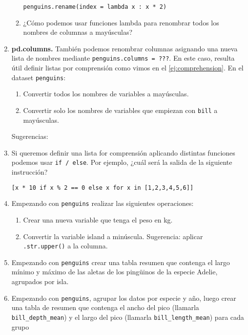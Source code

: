 \documentclass[a4paper,11pt]{article}
\theoremstyle{definition}
\begin{document}
\begin{enumerate}
\begin{enumerate}
\lstinline{penguins.rename(index = lambda x : x * 2)}

\item ¿Cómo podemos usar funciones lambda para renombrar todos los nombres de columnas a mayúsculas?
\end{enumerate}


\item \textbf{pd.columns.} También podemos renombrar columnas asignando una nueva lista de nombres mediante \lstinline{penguins.columns = ???}. En este caso, resulta útil definir listas por comprensión como vimos en el \ref{ej:comprehension}. En el dataset \lstinline{penguins}:

\begin{enumerate}
\item Convertir todos los nombres de variables a mayúsculas.
\item Convertir solo los nombres de variables que empiezan con \lstinline{bill} a mayúsculas.
\end{enumerate}

Sugerencias:
\item Si queremos definir una lista for comprensión aplicando distintas funciones podemos usar \lstinline{if / else}. Por ejemplo, ¿cuál será la salida de la siguiente instrucción?

\lstinline{[x * 10 if x % 2 == 0 else x for x in [1,2,3,4,5,6]]}


\item Empezando con \lstinline{penguins} realizar las siguientes operaciones:
\begin{enumerate}
\item Crear una nueva variable que tenga el peso en kg.
\item Convertir la variable island a minúscula. Sugerencia: aplicar \lstinline{.str.upper()} a la columna.
\end{enumerate}

\item Empezando con \lstinline{penguins} crear una tabla resumen que contenga el largo mínimo y máximo de las aletas de los ping\"uinos de la especie Adelie, agrupados por isla.

\item Empezando con \lstinline{penguins}, agrupar los datos por especie y año, luego crear una tabla de resumen que contenga el ancho del pico (llamarla \lstinline{bill_depth_mean}) y el largo del pico (llamarla \lstinline{bill_length_mean}) para cada grupo


\end{enumerate}
\end{document}

